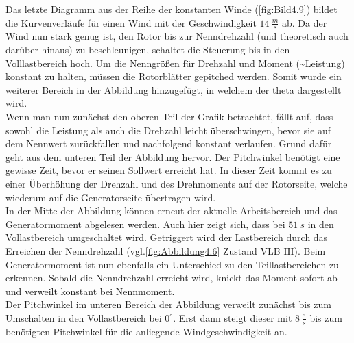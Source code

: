 Das letzte Diagramm aus der Reihe der konstanten Winde (\autoref{fig:Bild4.9}) bildet die Kurvenverläufe für einen Wind mit der Geschwindigkeit $\SI{14}{\frac{m}{s}}$ ab. Da der Wind nun stark genug ist, den Rotor bis zur Nenndrehzahl (und theoretisch auch darüber hinaus) zu beschleunigen, schaltet die Steuerung bis in den Volllastbereich hoch. Um die Nenngrößen für Drehzahl und Moment (\sim Leistung) konstant zu halten, müssen die Rotorblätter gepitched werden. Somit wurde ein weiterer Bereich in der Abbildung hinzugefügt, in welchem der \ac{theta} dargestellt wird.\\
Wenn man nun zunächst den oberen Teil der Grafik betrachtet, fällt auf, dass sowohl die Leistung als auch die Drehzahl leicht überschwingen, bevor sie auf dem Nennwert zurückfallen und nachfolgend konstant verlaufen. Grund dafür geht aus dem unteren Teil der Abbildung hervor. Der Pitchwinkel benötigt eine gewisse Zeit, bevor er seinen Sollwert erreicht hat. In dieser Zeit kommt es zu einer Überhöhung der Drehzahl und des Drehmoments auf der Rotorseite, welche wiederum auf die Generatorseite übertragen wird.\\
In der Mitte der Abbildung können erneut der aktuelle Arbeitsbereich und das Generatormoment abgelesen werden. Auch hier zeigt sich, dass bei \ca $\SI{51}{s}$ in den Vollastbereich umgeschaltet wird. Getriggert wird der Lastbereich durch das Erreichen der Nenndrehzahl (vgl.\xspace \autoref{fig:Abbildung4.6} Zustand VLB $\mathrm{III}$). Beim Generatormoment ist nun ebenfalls ein Unterschied zu den Teillastbereichen zu erkennen. Sobald die Nenndrehzahl erreicht wird, knickt das Moment sofort ab und verweilt konstant bei Nennmoment.\\
Der Pitchwinkel im unteren Bereich der Abbildung verweilt zunächst bis zum Umschalten in den Vollastbereich bei $0^\circ$. Erst dann steigt dieser mit $\SI{8}{\frac{^\circ}{s}}$ bis zum benötigten Pitchwinkel für die anliegende Windgeschwindigkeit an.

